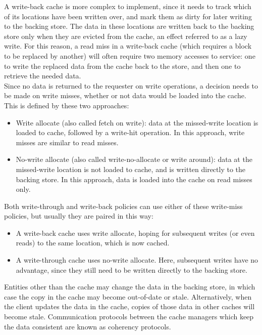 A write-back cache is more complex to implement, since it needs to track which of its locations have been written
over, and mark them as dirty for later writing to the backing store.
The data in these locations are written back to
the backing store only when they are evicted from the cache, an effect referred to as a lazy write.
For this reason, a read miss in a write-back cache (which requires a block to be replaced by another) will often
require two memory accesses to service: one to write the replaced data from the cache back to the store, and then one
to retrieve the needed data.\\
Since no data is returned to the requester on write operations, a decision needs to be made on write misses, whether
or not data would be loaded into the cache.
This is defined by these two approaches:
\begin{itemize}
    \item Write allocate (also called fetch on write): data at the missed-write location is loaded to cache, followed
    by a write-hit operation.
    In this approach, write misses are similar to read misses.
    \item  No-write allocate (also called write-no-allocate or write around): data at the missed-write location is
    not loaded to cache, and is written directly to the backing store.
    In this approach, data is loaded into the cache on read misses only.
\end{itemize}
Both write-through and write-back policies can use either of these write-miss policies, but usually they are paired in this way:
\begin{itemize}
    \item A write-back cache uses write allocate, hoping for subsequent writes (or even reads) to the same location,
    which is now cached.
    \item  A write-through cache uses no-write allocate.
    Here, subsequent writes have no advantage, since they still need to be written directly to the backing store.
\end{itemize}

Entities other than the cache may change the data in the backing store, in which case the copy in the cache may
become out-of-date or stale.
Alternatively, when the client updates the data in the cache, copies of those data in other caches will become stale.
Communication protocols between the cache managers which keep the data consistent are known as coherency protocols.

